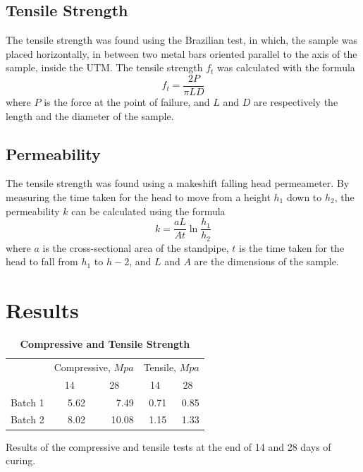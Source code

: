 \documentclass{ieeeaccess}
\begin{document}
\subsection{Tensile Strength}
The tensile strength was found using the Brazilian test, in which, the sample
was placed horizontally, in between two metal bars oriented parallel to the axis
of the sample, inside the UTM. The tensile strength $f_t$ was calculated with
the formula \[f_t = \frac{2P}{\pi LD}\] where $P$ is the force at the point of
failure, and $L$ and $D$ are respectively the length and the diameter of the
sample.

\subsection{Permeability}
The tensile strength was found using a makeshift falling head permeameter.
By measuring the time taken for the head to move from a height $h_1$ down to
$h_2$, the permeability $k$ can be calculated using the formula 
\[k = \frac{aL}{At} \ln{\frac{h_1}{h_2}}\] where $a$ is the cross-sectional area
of the standpipe, $t$ is the time taken for the head to fall from $h_1$ to 
$h-2$, and $L$ and $A$ are the dimensions of the sample.


\section{Results}

\begin{table}
    \begin{threeparttable}
        \caption{\textbf{Compressive and Tensile Strength}}
        \label{table:str-test}
        \setlength{\tabcolsep}{16.5pt}
        \def\arraystretch{1.5}%
        \begin{tabular}{ l r r r r }
            \hline
            & \multicolumn{2}{c}{Compressive, $Mpa$} & 
                \multicolumn{2}{c}{Tensile, $Mpa$} \\

            \cline{2-5}
            & \multicolumn{1}{c}{14} & \multicolumn{1}{c}{28} & 
                \multicolumn{1}{c}{14} & \multicolumn{1}{c}{28} \\

            \hline

            Batch 1 & 5.62 & 7.49  & 0.71 & 0.85 \\
            Batch 2 & 8.02 & 10.08 & 1.15 & 1.33 \\

            \hline
        \end{tabular} 
        \begin{tablenotes}
            \item Results of the compressive and tensile tests at the end of 
            14 and 28 days of curing.
        \end{tablenotes}
    \end{threeparttable}
\end{table}
\end{document}
